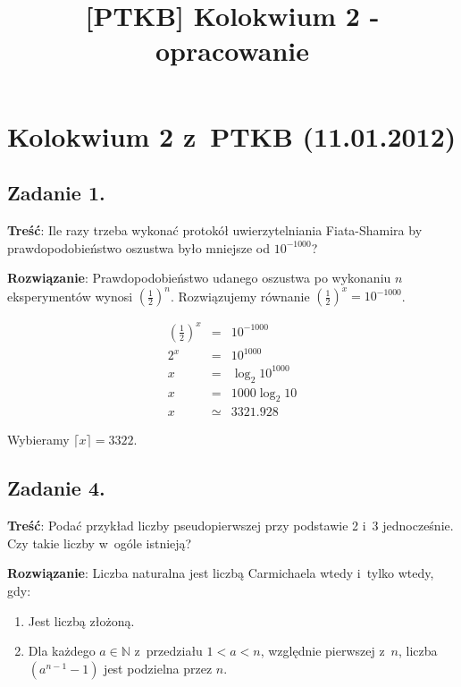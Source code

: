\documentclass[a4paper,10pt, twocolumn]{article}
\title{[PTKB] Kolokwium 2 - opracowanie}
\author{}
\date{}
\begin{document}
\maketitle

\section{Kolokwium 2 z~PTKB (11.01.2012)}

\subsection{Zadanie 1.}
\label{subsec:KolZadanie1}

\textbf{Treść}: Ile razy trzeba wykonać protokół uwierzytelniania Fiata-Shamira by prawdopodobieństwo oszustwa było mniejsze od $10^{-1000}$?

\textbf{Rozwiązanie}: Prawdopodobieństwo udanego oszustwa po wykonaniu $n$ eksperymentów wynosi $(\frac{1}{2})^{n}$. Rozwiązujemy równanie $(\frac{1}{2})^{x} = 10^{-1000}$.

\begin{equation*}
	\begin{array}{lcl} (\frac{1}{2})^{x} & = & 10^{-1000} \\ 2^{x} & = & 10^{1000} \\ x & = & \log_{2} 10^{1000} \\ x & = & 1000 \log_{2} 10 \\ x & \simeq & 3321.928 \end{array}
\end{equation*}

Wybieramy $\lceil x \rceil = 3322$.

\subsection{Zadanie 4.}

\textbf{Treść}: Podać przykład liczby pseudopierwszej przy podstawie 2 i~3 jednocześnie. Czy takie liczby w~ogóle istnieją?

\textbf{Rozwiązanie}: Liczba naturalna jest liczbą Carmichaela wtedy i~tylko wtedy, gdy:

\begin{enumerate}
 \item Jest liczbą złożoną.
 \item Dla każdego $a \in \mathbb{N}$ z~przedziału $1 < a < n$, względnie pierwszej z~$n$, liczba $(a^{n-1} - 1)$ jest podzielna przez $n$.
\end{enumerate}
\end{document}
